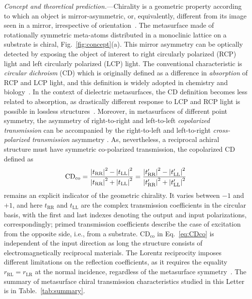 \documentclass[
    reprint,
    superscriptaddress,
    a4paper,
    amsmath,amssymb,
    prb,
]{revtex4-2}
\begin{document}
\textit{Concept and theoretical prediction.}---Chirality is a geometric property according to which an object is mirror-asymmetric, or, equivalently, different from its image seen in a mirror, irrespective of orientation~\cite{Caloz2020Feb}.
The metasurface made of rotationally symmetric meta-atoms distributed in a monoclinic lattice on a substrate is chiral, Fig.~\ref{fig:concept}{(a)}.
This mirror asymmetry can be optically detected by exposing the object of interest to right circularly polarized (RCP) light and left circularly polarized (LCP) light.
The conventional characteristic is \textit{circular dichroism} (CD) which is originally defined as a difference in \textit{absorption} of RCP and LCP light, and this definition is widely adopted in chemistry and biology~\cite{fasman2013circular,Kobayashi2011Nov,Baase1979Feb}. 
In the context of dielectric metasurfaces, the CD definition becomes less related to absorption, as drastically different response to LCP and RCP light is possible in lossless structures~\cite{Hu2017Jan,Gorkunov2020Aug,Kim2020Aug}.
Moreover, in metasurfaces of different point symmetry, the asymmetry of right-to-right and left-to-left \textit{copolarized transmission} can be accompanied by the right-to-left  and left-to-right \textit{cross-polarized transmission} 
asymmetry \cite{Koshelev2024JOPT}. 
As, nevertheless, a reciprocal achiral structure must have symmetric co-polarized  transmission, the copolarized CD defined as
\begin{equation}
    \mathrm{CD}_{\text{co}} = \frac{\abs{t_{\text{RR}}}^2 - \abs{t_{\text{LL}}}^2}{\abs{t_{\text{RR}}}^2 + \abs{t_{\text{LL}}}^2} = \frac{\abs{t^{\prime}_{\text{RR}}}^2 - \abs{t^{\prime}_{\text{LL}}}^2}{\abs{t^{\prime}_{\text{RR}}}^2 + \abs{t^{\prime}_{\text{LL}}}^2}
    \label{eq:CDco}
\end{equation}
remains an explicit indicator of the geometric chirality. 
It varies between $-1$ and $+1$, and here $t_{\text{RR}}$ and $t_{\text{LL}}$ are the complex transmission coefficients in the circular basis, with the first and last indexes denoting the output and input polarizations, correspondingly; primed transmission coefficients describe the case of excitation from the opposite side, i.e., from a substrate.
$\mathrm{CD}_{\text{co}}$ in Eq.~\eqref{eq:CDco} is independent of the input direction as long the structure consists of electromagnetically reciprocal materials. 
The Lorentz reciprocity imposes different limitations on the reflection coefficients, as it requires the equality $r_{\text{RL}}=r_{\text{LR}}$ at the normal incidence, regardless of the metasurface symmetry~\cite{Koshelev2024JOPT,Gorkunov2024}. 
The summary of metasurface chiral transmission characteristics studied in this Letter is in Table.~\ref{tab:summary}.
\end{document}
